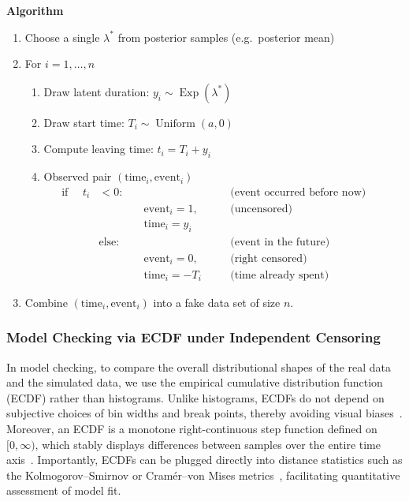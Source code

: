 \begin{tcolorbox}
\textbf{Algorithm}
\begin{enumerate}[itemsep=2pt,parsep=0pt,topsep=2pt]
  \item Choose a single $\lambda^\ast$ from posterior samples \hfill (e.g.\ posterior mean)
  \item For $i = 1,\dots,n$
          \begin{enumerate}
            \item Draw latent duration: $y_i \sim \operatorname{Exp}(\lambda^\ast)$
            \item Draw start time: $T_i \sim \operatorname{Uniform}(a,0)$
            \item Compute leaving time: $t_i = T_i + y_i$
            \item Observed pair $(\text{time}_i,\text{event}_i)$ \[\begin{aligned}
\text{if } \quad t_i &< 0: &&&\text{(event occurred before now)}\\
  &&\quad  \text{event}_i=1, &&\text{(uncensored)}\\ 
  &&\quad \text{time}_i=y_i
   &\quad \\
&\text{else}: &&&\text{(event in the future)}\\
   &&\quad \text{event}_i=0, &&\text{(right censored)}\\ 
   &&\quad \text{time}_i=-T_i &&\text{(time already spent)}
   &\quad 
\end{aligned}\]
          \end{enumerate}
  \item Combine $(\text{time}_i,\text{event}_i)$ into a fake data set of size $n$.
\end{enumerate}
\end{tcolorbox}





\subsubsection{Model Checking via ECDF under Independent Censoring}
In model checking, to compare the overall distributional shapes of the real data and the simulated data, we use the empirical cumulative distribution function (ECDF) rather than histograms. Unlike histograms, ECDFs do not depend on subjective choices of bin widths and break points, thereby avoiding visual biases~\cite{berg2008data}. Moreover, an ECDF is a monotone right-continuous step function defined on $[0,\infty)$, which stably displays differences between samples over the entire time axis~\cite{arnold2011nonparametric, berg2008data}. Importantly, ECDFs can be plugged directly into distance statistics such as the Kolmogorov–Smirnov or Cramér–von Mises metrics~\cite{arnold2011nonparametric}, facilitating quantitative assessment of model fit.

